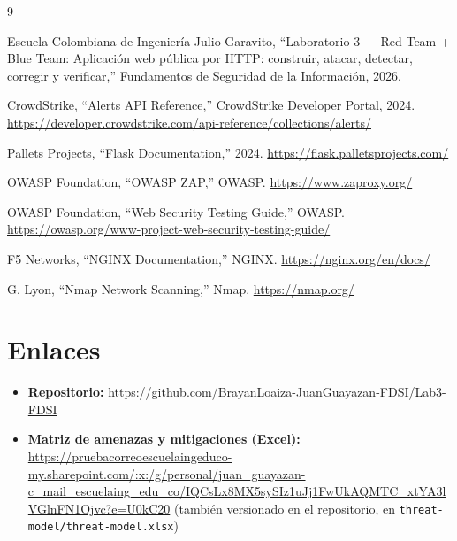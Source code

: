 \documentclass[journal]{IEEEtran}
\begin{document}
\begin{thebibliography}{9}

Escuela Colombiana de Ingeniería Julio Garavito,
``Laboratorio 3 --- Red Team + Blue Team: Aplicación web pública por HTTP:
construir, atacar, detectar, corregir y verificar,''
Fundamentos de Seguridad de la Información, 2026.

CrowdStrike,
``Alerts API Reference,''
CrowdStrike Developer Portal, 2024.
\url{https://developer.crowdstrike.com/api-reference/collections/alerts/}

Pallets Projects,
``Flask Documentation,'' 2024.
\url{https://flask.palletsprojects.com/}

OWASP Foundation,
``OWASP ZAP,''
OWASP.
\url{https://www.zaproxy.org/}

OWASP Foundation,
``Web Security Testing Guide,''
OWASP.
\url{https://owasp.org/www-project-web-security-testing-guide/}

F5 Networks,
``NGINX Documentation,''
NGINX.
\url{https://nginx.org/en/docs/}

G. Lyon,
``Nmap Network Scanning,''
Nmap.
\url{https://nmap.org/}

\end{thebibliography}

\appendices

\section{Enlaces}
\label{app:enlaces}

\begin{itemize}
    \item \textbf{Repositorio:}
    \url{https://github.com/BrayanLoaiza-JuanGuayazan-FDSI/Lab3-FDSI}
    \item \textbf{Matriz de amenazas y mitigaciones (Excel):}
    \url{https://pruebacorreoescuelaingeduco-my.sharepoint.com/:x:/g/personal/juan_guayazan-c_mail_escuelaing_edu_co/IQCsLx8MX5sySIz1uJj1FwUkAQMTC_xtYA3lVGlnFN1Ojvc?e=U0kC20}
    (también versionado en el repositorio, en
    \texttt{threat-model/threat-model.xlsx})
\end{itemize}
\end{document}
